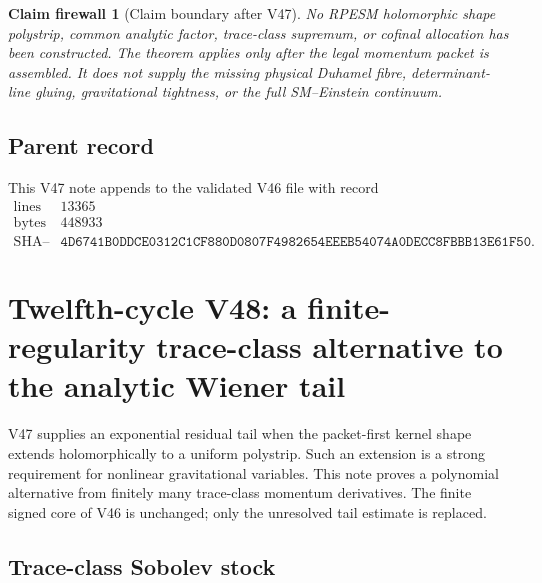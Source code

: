 \documentclass[11pt]{article}
\newtheorem{firewall}[theorem]{Claim firewall}
\theoremstyle{remark}
\begin{document}
\begin{firewall}[Claim boundary after V47]
\label{fire:v12v47-claim}
No RPESM holomorphic shape polystrip, common analytic factor,
trace-class supremum, or cofinal allocation has been constructed.
The theorem applies only after the legal momentum packet is
assembled.  It does not supply the missing physical Duhamel fibre,
determinant-line gluing, gravitational tightness, or the full
SM--Einstein continuum.
\end{firewall}

\subsection{Parent record}

This V47 note appends to the validated V46 file with record
\[
\begin{array}{c|c}
\text{lines}&13365\\
\text{bytes}&448933\\
\text{SHA--256}&
\texttt{4D6741B0DDCE0312C1CF880D0807F4982654EEEB54074A0DECC8FBBB13E61F50}.
\end{array}
\]


\section{Twelfth-cycle V48: a finite-regularity trace-class
alternative to the analytic Wiener tail}
\label{sec:v12v48}

V47 supplies an exponential residual tail when the packet-first
kernel shape extends holomorphically to a uniform polystrip.  Such an
extension is a strong requirement for nonlinear gravitational
variables.  This note proves a polynomial alternative from finitely
many trace-class momentum derivatives.  The finite signed core of
V46 is unchanged; only the unresolved tail estimate is replaced.

\subsection{Trace-class Sobolev stock}
\end{document}
